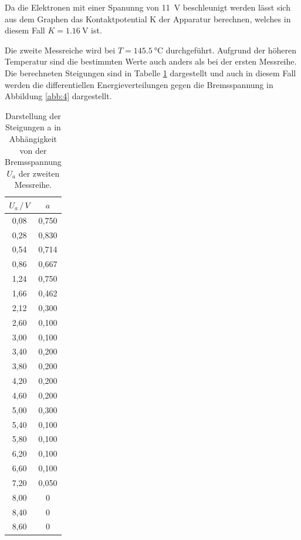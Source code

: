 Da die Elektronen mit einer Spanunng von \SI{11}{\volt} beschleunigt werden lässt
sich aus dem Graphen das Kontaktpotential K der Apparatur berechnen, welches in diesem
Fall $ K = \SI{1.16}{\volt}$ ist.

Die zweite Messreiche wird bei $ T = \SI{145.5}{\celsius}$ durchgeführt.
Aufgrund der höheren Temperatur sind die bestimmten Werte auch anders als bei der
ersten Messreihe. Die berechneten Steigungen sind in Tabelle \ref{tab:2} dargestellt
und auch in diesem Fall werden die differentiellen Energieverteilungen gegen
die Bremsspannung in Abbildung \ref{abb:4} dargestellt.

\begin{table}[H]
  \centering
  \caption{Darstellung der Steigungen a in Abhängigkeit von der Bremsspannung $U_a$
  der zweiten Messreihe.}
  \label{tab:2}
  \begin{tabular}{c c}
    \toprule
    $U_a \, / \, V$ & $a$ \\
    \midrule
    0,08 & 0,750  \\
    0,28 & 0,830  \\
    0,54 & 0,714  \\
    0,86 & 0,667  \\
    1,24 & 0,750  \\
    1,66 & 0,462  \\
    2,12 & 0,300  \\
    2,60 & 0,100  \\
    3,00 & 0,100  \\
    3,40 & 0,200  \\
    3,80 & 0,200  \\
    4,20 & 0,200  \\
    4,60 & 0,200  \\
    5,00 & 0,300  \\
    5,40 & 0,100  \\
    5,80 & 0,100  \\
    6,20 & 0,100  \\
    6,60 & 0,100  \\
    7,20 & 0,050  \\
    8,00 & 0  \\
    8,40 & 0  \\
    8,60 & 0  \\
    \bottomrule
  \end{tabular}
\end{table}

